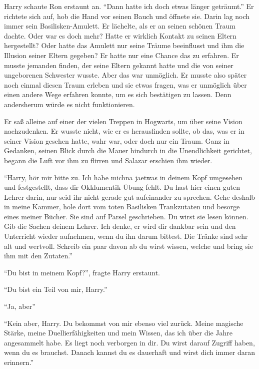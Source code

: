 Harry schaute Ron erstaunt an. \enquote{Dann hatte ich doch etwas länger geträumt.} Er richtete sich auf, hob die Hand vor seinen Bauch und öffnete sie. Darin lag noch immer sein Basilisken-Amulett. Er lächelte, als er an seinen schönen Traum dachte. Oder war es doch mehr? Hatte er wirklich Kontakt zu seinen Eltern hergestellt? Oder hatte das Amulett nur seine Träume beeinflusst und ihm die Illusion seiner Eltern gegeben? Er hatte nur eine Chance das zu erfahren. Er musste jemanden finden, der seine Eltern gekannt hatte und die von seiner ungeborenen Schwester wusste. Aber das war unmöglich. Er musste also später noch einmal diesen Traum erleben und sie etwas fragen, was er unmöglich über einen andere Wege erfahren konnte, um es sich bestätigen zu lassen. Denn andersherum würde es nicht funktionieren.

\trenn

Er saß alleine auf einer der vielen Treppen in Hogwarts, um über seine Vision nachzudenken. Er wusste nicht, wie er es herausfinden sollte, ob das, was er in seiner Vision gesehen hatte, wahr war, oder doch nur ein Traum. Ganz in Gedanken, seinen Blick durch die Mauer hindurch in die Unendlichkeit gerichtet, begann die Luft vor ihm zu flirren und Salazar erschien ihm wieder.

\enquote{Harry, hör mir bitte zu. Ich habe mich\abs na ja\abs etwas in deinem Kopf umgesehen und festgestellt, dass dir Okklumentik-Übung fehlt. Du hast hier einen guten Lehrer darin, nur seid ihr nicht gerade gut aufeinander zu sprechen. Gehe deshalb in meine Kammer, hole dort vom toten Basilisken Trankzutaten und besorge eines meiner Bücher. Sie sind auf Parsel geschrieben. Du wirst sie lesen können. Gib die Sachen deinem Lehrer. Ich denke, er wird dir dankbar sein und den Unterricht wieder aufnehmen, wenn du ihn darum bittest. Die Tränke sind sehr alt und wertvoll. Schreib ein paar davon ab \gst du wirst wissen, welche \gst und bring sie ihm mit den Zutaten.}

\enquote{Du bist in meinem Kopf?}, fragte Harry erstaunt.

\enquote{Du bist ein Teil von mir, Harry.}

\enquote{Ja, aber\abs}

\enquote{Kein aber, Harry. Du bekommst von mir ebenso viel zurück. Meine magische Stärke, meine Duellierfähigkeiten und mein Wissen, das ich über die Jahre angesammelt habe. Es liegt noch verborgen in dir. Du wirst darauf Zugriff haben, wenn du es brauchst. Danach kannst du es dauerhaft und wirst dich immer daran erinnern.}

